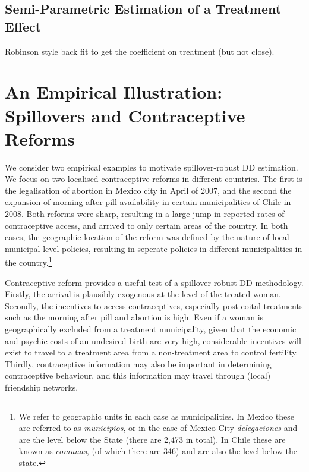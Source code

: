 \documentclass{article}
\begin{document}
\begin{spacing}{1.1}










\subsection{Semi-Parametric Estimation of a Treatment Effect}
Robinson style back fit to get the coefficient on treatment (but not close).
\citet{Imbens2004}

\section{An Empirical Illustration: Spillovers and Contraceptive Reforms}
We consider two empirical examples to motivate spillover-robust DD estimation.
We focus on two localised contraceptive reforms in different countries. The first
is the legalisation of abortion in Mexico city in April of 2007, and the second
the expansion of morning after pill availability in certain municipalities of 
Chile in 2008.  Both reforms were sharp, resulting in a large jump in reported
rates of contraceptive access, and arrived to only certain areas of the country.
In both cases, the geographic location of the reform was defined by the nature
of local municipal-level policies, resulting in seperate policies in different
municipalities in the country.\footnote{We refer to geographic units in each case
as municipalities.  In Mexico these are referred to as \emph{municipios}, or in 
the case of Mexico City \emph{delegaciones} and are the level below the State 
(there are 2,473 in total).  In Chile these are known as \emph{comunas}, (of 
which there are 346) and are also the level below the state.}

Contraceptive reform provides a useful test of a spillover-robust DD methodology.
Firstly, the arrival is plausibly exogenous at the level of the treated woman.
Secondly, the incentives to access contraceptives, especially post-coital 
treatments such as the morning after pill and abortion is high.  Even if a woman
is geographically excluded from a treatment municipality, given that the economic
and psychic costs of an undesired birth are very high, considerable incentives
will exist to travel to a treatment area from a non-treatment area to control
fertility.  Thirdly, contraceptive information may also be important in
determining contraceptive behaviour, and this information may travel through
(local) friendship networks.


\end{spacing}
\end{document}
